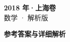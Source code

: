 \documentclass[zihao=-4, a4paper]{ctexart}
\begin{document}
\begin{center}
  {\Large\bfseries 2018 年·上海卷}\\[4pt]
  {\large 数学 · 解析版}
\end{center}
\medskip
{}

\clearpage
{}
\begin{center}{\Large\bfseries 参考答案与详细解析}\end{center}
\medskip

\end{document}

